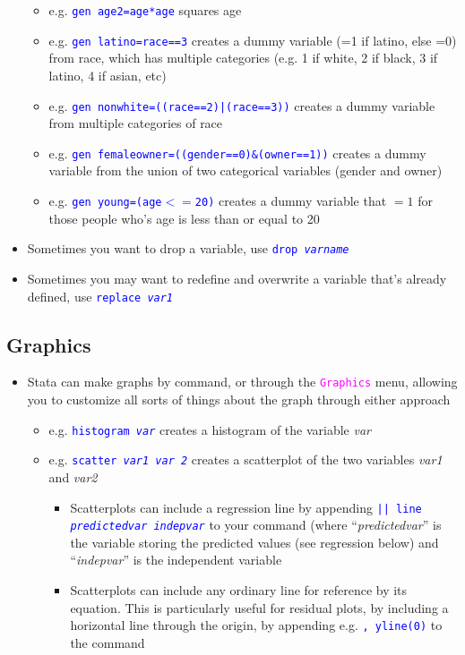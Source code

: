 \documentclass{article}
\begin{document}
\begin{itemize}
\begin{itemize}
			\item e.g. \textcolor{blue}{\texttt{gen age2=age*age}} squares age
			\item e.g. \textcolor{blue}{\texttt{gen latino=race==3}} creates a dummy variable (=1 if latino, else =0) from race, which has multiple categories (e.g. 1 if white, 2 if black, 3 if latino, 4 if asian, etc) 
			\item e.g. \textcolor{blue}{\texttt{gen nonwhite=((race==2)|(race==3))}} creates a dummy variable from multiple categories of race
			\item e.g. \textcolor{blue}{\texttt{gen femaleowner=((gender==0)\&(owner==1))}} creates a dummy variable from the union of two categorical variables (gender and owner) 
			\item e.g. \textcolor{blue}{\texttt{gen young=(age$<=$20)}} creates a dummy variable that $=1$ for those people who's age is less than or equal to 20
		\end{itemize}	
		\item Sometimes you want to drop a variable, use \texttt{\textcolor{blue}{drop \emph{varname}}}
		\item Sometimes you may want to redefine and overwrite a variable that's already defined, use \texttt{\textcolor{blue}{replace \emph{var1}}}
	\end{itemize}

\subsection{Graphics}
\begin{itemize} 
	\item Stata can make graphs by command, or through the \textcolor{magenta}{\texttt{Graphics}} menu, allowing you to customize all sorts of things about the graph through either approach 
	\begin{itemize}
		\item e.g. \texttt{\textcolor{blue}{histogram \emph{var}}} creates a histogram of the variable \emph{var}
		\item e.g. \texttt{\textcolor{blue}{scatter \emph{var1} \emph{var 2}}} creates a scatterplot of the two variables \emph{var1} and \emph{var2}
		\begin{itemize}
			\item Scatterplots can include a regression line by appending \textcolor{blue}{\texttt{|| line \emph{predictedvar indepvar}}} to your command (where ``\emph{predictedvar}'' is the variable storing the predicted values (see regression below) and ``\emph{indepvar}'' is the independent variable
			\item Scatterplots can include any ordinary line for reference by its equation. This is particularly useful for residual plots, by including a horizontal line through the origin, by appending e.g. \textcolor{blue}{\texttt{, yline(0)}} to the command
		\end{itemize}
	\end{itemize}
\end{itemize}
\end{document}
